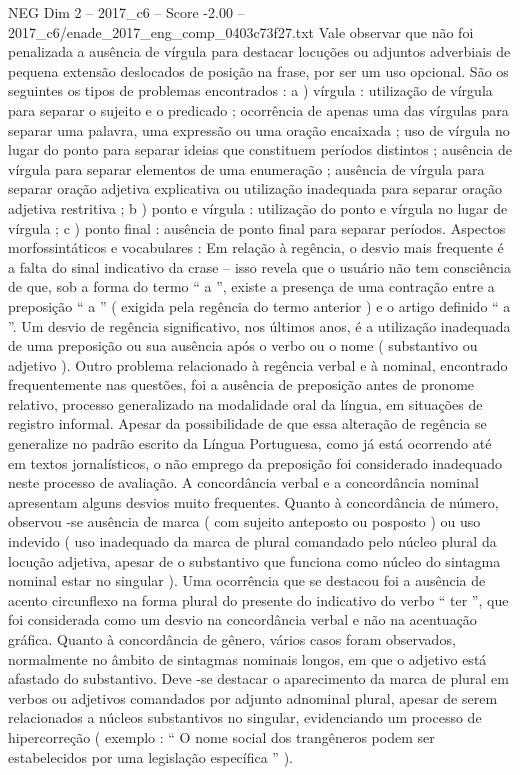\begin{textsample}{NEG Dim 2 – 2017\_c6 – Score -2.00 – 2017\_c6/enade\_2017\_eng\_comp\_0403c73f27.txt}
Vale observar que não foi penalizada a ausência de vírgula para destacar locuções ou adjuntos adverbiais de pequena extensão deslocados de posição na frase, por ser um uso opcional.
São os seguintes os tipos de problemas encontrados : a ) vírgula : utilização de vírgula para separar o sujeito e o predicado ; ocorrência de apenas uma das vírgulas para separar uma palavra, uma expressão ou uma oração encaixada ; uso de vírgula no lugar do ponto para separar ideias que constituem períodos distintos ; ausência de vírgula para separar elementos de uma enumeração ; ausência de vírgula para separar oração adjetiva explicativa ou utilização inadequada para separar oração adjetiva restritiva ; b ) ponto e vírgula : utilização do ponto e vírgula no lugar de vírgula ; c ) ponto final : ausência de ponto final para separar períodos.
Aspectos morfossintáticos e vocabulares : Em relação à regência, o desvio mais frequente é a falta do sinal indicativo da crase – isso revela que o usuário não tem consciência de que, sob a forma do termo “ a ”, existe a presença de uma contração entre a preposição “ a ” ( exigida pela regência do termo anterior ) e o artigo definido “ a ”.
Um desvio de regência significativo, nos últimos anos, é a utilização inadequada de uma preposição ou sua ausência após o verbo ou o nome ( substantivo ou adjetivo ).
Outro problema relacionado à regência verbal e à nominal, encontrado frequentemente nas questões, foi a ausência de preposição antes de pronome relativo, processo generalizado na modalidade oral da língua, em situações de registro informal.
Apesar da possibilidade de que essa alteração de regência se generalize no padrão escrito da Língua Portuguesa, como já está ocorrendo até em textos jornalísticos, o não emprego da preposição foi considerado inadequado neste processo de avaliação.
A concordância verbal e a concordância nominal apresentam alguns desvios muito frequentes.
Quanto à concordância de número, observou -se ausência de marca ( com sujeito anteposto ou posposto ) ou uso indevido ( uso inadequado da marca de plural comandado pelo núcleo plural da locução adjetiva, apesar de o substantivo que funciona como núcleo do sintagma nominal estar no singular ).
Uma ocorrência que se destacou foi a ausência de acento circunflexo na forma plural do presente do indicativo do verbo “ ter ”, que foi considerada como um desvio na concordância verbal e não na acentuação gráfica.
Quanto à concordância de gênero, vários casos foram observados, normalmente no âmbito de sintagmas nominais longos, em que o adjetivo está afastado do substantivo.
Deve -se destacar o aparecimento da marca de plural em verbos ou adjetivos comandados por adjunto adnominal plural, apesar de serem relacionados a núcleos substantivos no singular, evidenciando um processo de hipercorreção ( exemplo : “ O nome social dos trangêneros podem ser estabelecidos por uma legislação específica ” ).

\end{textsample}
